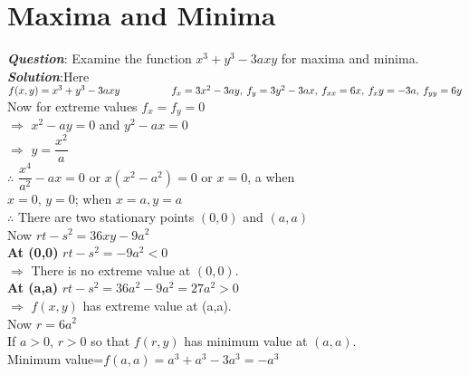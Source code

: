 \documentclass{report}
\begin{document}
	\chapter{Maxima and Minima}
		\textbf{\textit{Question}}: Examine the function \(x^3+y^3-3axy\) for maxima and minima.
		\\[10pt]
		\textbf{\textit{Solution}}:Here \(f(x,y)=x^3+y^3-3axy \\[8pt]
		\hspace*{5em} f_x=3x^2-3ay,\: f_y=3y^2-3ax,\: f_{xx}=6x,\: f_xy=-3a,\: f_{yy}=6y \) \\[8pt]
		 Now for extreme values \qquad \(f_x=f_y=0\) \\[8pt]
		$\Rightarrow$ \qquad $x^2-ay=0$ and $y^2-ax=0$ \\[8pt]
		$\Rightarrow$ \qquad $y=\dfrac{x^2}{a}$ \\[8pt]
		$\therefore$  $\dfrac{x^4}{a^2}-ax=0$\: or\: $x(x^2-a^2)=0$\: or\: $x=0$,\: a when \\[5pt]
		$x=0$, $y=0$; when $x=a,y=a$ \\[8pt]
		$\therefore$\: There are two stationary points $(0,0)$ and $(a,a)$ \\[8pt]
		Now $rt-s^2=36xy-9a^2$ \\[8pt]
		\textbf{At (0,0)}\: \(rt-s^2=-9a^2 < 0\) \\[8pt]
		$\Rightarrow$ \qquad There is no extreme value at \((0,0)\). \\[8pt]
		\textbf{At (a,a)}\: \(rt-s^2=36a^2-9a^2=27a^2 > 0\) \\[8pt]
		$\Rightarrow$ \qquad $f(x,y)$ has extreme value at (a,a). \\[8pt]
		Now \(r=6a^2\) \\[8pt]
		If \(a>0\), \(r>0\) so that \(f(r,y)\) has minimum value at \((a,a)\). \\[8pt]
		Minimum value=\(f(a,a)=a^3+a^3-3a^3=-a^3\) \\ 
\end{document}

